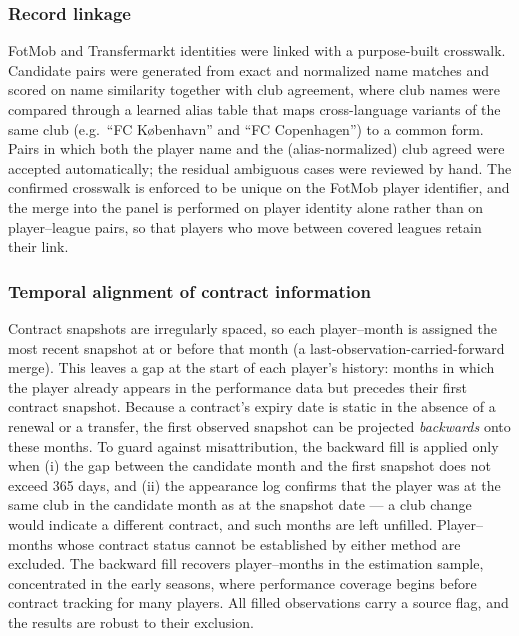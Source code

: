 \documentclass{article}
\begin{document}
\subsubsection{Record linkage}

FotMob and Transfermarkt identities were linked with a purpose-built
crosswalk. Candidate pairs were generated from exact and normalized
name matches and scored on name similarity together with club
agreement, where club names were compared through a learned alias
table that maps cross-language variants of the same club (e.g.\ ``FC
K\o benhavn'' and ``FC Copenhagen'') to a common form. Pairs in which
both the player name and the (alias-normalized) club agreed were
accepted automatically; the residual ambiguous cases were reviewed by
hand. The confirmed crosswalk is enforced to be unique on the FotMob
player identifier, and the merge into the panel is performed on
player identity alone rather than on player--league pairs, so that
players who move between covered leagues retain their link.

\subsubsection{Temporal alignment of contract information}

Contract snapshots are irregularly spaced, so each player--month is
assigned the most recent snapshot at or before that month (a
last-observation-carried-forward merge). This leaves a gap at the
start of each player's history: months in which the player already
appears in the performance data but precedes their first contract
snapshot. Because a contract's expiry date is static in the absence
of a renewal or a transfer, the first observed snapshot can be
projected \emph{backwards} onto these months. To guard against
misattribution, the backward fill is applied only when (i) the gap
between the candidate month and the first snapshot does not exceed
365 days, and (ii) the appearance log confirms that the player was at
the same club in the candidate month as at the snapshot date --- a
club change would indicate a different contract, and such months are
left unfilled. Player--months whose contract status cannot be
established by either method are excluded. The backward fill
recovers \NBackfilledStrict{} player--months in the estimation sample,
concentrated in the early seasons, where performance coverage begins
before contract tracking for many players. All filled observations carry a source
flag, and the results are robust to their exclusion.
\end{document}
